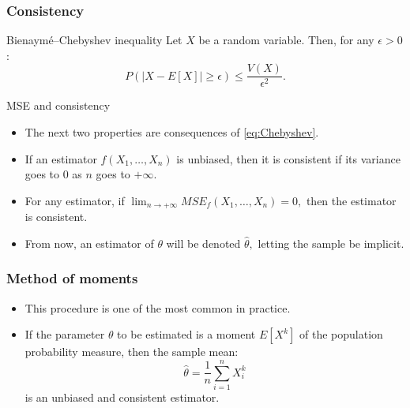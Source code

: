 \documentclass[main.tex]{subfiles}
\begin{document}
\begin{frame}
    \frametitle{Consistency}
    \begin{block}{Bienaymé–Chebyshev inequality}
        Let $X$ be a random variable. Then, for any
        $\epsilon > 0$:
        \begin{equation}
            \label{eq:Chebyshev}
            P\left( \lvert X- E\left[ X \right] \rvert \geq \epsilon \right) \leq \frac{V(X)}{\epsilon^2}.
        \end{equation}
    \end{block}
    \begin{block}{MSE and consistency}
        \begin{itemize}
            \item<+-> The next two properties are consequences of \ref{eq:Chebyshev}.
            \item<+-> If an estimator $f\left( X_1, \dots, X_n \right)$ is unbiased, then it is consistent
    if its variance goes to 0 as $n$ goes to $+\infty$.
            \item<+-> For any estimator, if $\lim_{n \to +\infty} MSE_f\left( X_1,\dots,X_n \right) = 0,$ then
            the estimator is consistent.
            \item<+-> From now, an estimator of $\theta$ will be denoted $\hat{\theta},$ letting the sample be implicit.
        \end{itemize}
    \end{block}
\end{frame}
\begin{frame}
    \frametitle{Method of moments}
\begin{itemize}
    \item<+-> This procedure is one of the most common in practice.
    \item<+-> If the parameter $\theta$ to be estimated is a moment $E\left[ X^k \right]$ of the population probability measure, then
    the sample mean:
    \begin{equation}
        \hat{\theta} = \frac{1}{n} \sum_{i=1}^n X_i^k
    \end{equation}
    is an unbiased and consistent estimator.
\end{itemize}
    

\end{frame}
\end{document}
